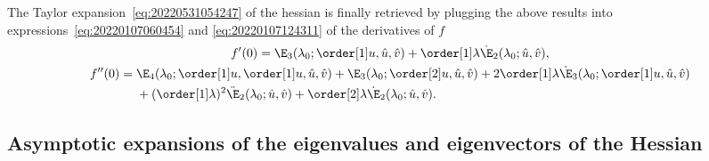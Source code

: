 The Taylor expansion~\eqref{eq:20220531054247} of the hessian is finally retrieved by plugging the above results into
expressions~\eqref{eq:20220107060454} and \eqref{eq:20220107124311} of the derivatives of $f$
\begin{gather*}
  f'(0) = \E_3(\lambda_0; \order[1]u, \hat{u}, \hat{v}) + \order[1]\lambda \dot{\E}_2(\lambda_0; \hat{u}, \hat{v}),\\
  \begin{aligned}[b]
    f''(0) = {} & \E_4(\lambda_0; \order[1]u, \order[1]u, \hat{u}, \hat{v}) + \E_3(\lambda_0; \order[2]u, \hat{u}, \hat{v}) + 2\order[1]\lambda \dot{\E}_3(\lambda_0; \order[1]u, \hat{u}, \hat{v})\\
                & + ( \order[1]\lambda )^2 \ddot{\E}_2(\lambda_0; \hat{u}, \hat{v}) + \order[2]\lambda \dot{\E}_2(\lambda_0; \hat{u}, \hat{v}).
  \end{aligned}
\end{gather*}

\subsection{Asymptotic expansions of the eigenvalues and eigenvectors of the Hessian}
\label{sec:20220616074108}

